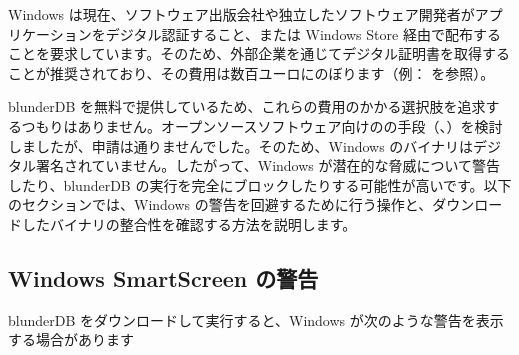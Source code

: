 \documentclass[letterpaper,10pt,dvipdfmx]{sphinxmanual}
\begin{document}
\sphinxAtStartPar
Windows は現在、ソフトウェア出版会社や独立したソフトウェア開発者がアプリケーションをデジタル認証すること、または Windows Store 経由で配布することを要求しています。そのため、外部企業を通じてデジタル証明書を取得することが推奨されており、その費用は数百ユーロにのぼります（例： を参照）。

\sphinxAtStartPar
blunderDB を無料で提供しているため、これらの費用のかかる選択肢を追求するつもりはありません。オープンソースソフトウェア向けのの手段（、）を検討しましたが、申請は通りませんでした。そのため、Windows のバイナリはデジタル署名されていません。したがって、Windows が潜在的な脅威について警告したり、blunderDB の実行を完全にブロックしたりする可能性が高いです。以下のセクションでは、Windows の警告を回避するために行う操作と、ダウンロードしたバイナリの整合性を確認する方法を説明します。


\subsection{Windows SmartScreen の警告}
\label{\detokenize{annexe_windows_securite:avertissement-windows-smartscreen}}
\sphinxAtStartPar
blunderDB をダウンロードして実行すると、Windows が次のような警告を表示する場合があります

\begin{figure}[htbp]
\centering

\noindent{}
\end{figure}
\end{document}
